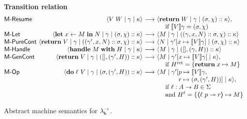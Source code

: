 \documentclass[12pt,phd,lfcs,twoside,openright,logo,leftchapter,normalheadings]{infthesis}
\theoremstyle{plain}
\theoremstyle{definition}
\begin{document}
\begin{figure*}
\raggedright

\textbf{Transition relation}
\[
  \bl
  \ba{@{}l@{~}r@{~}c@{~}l@{~~}l@{}}
\mlab{Resume} & \cek{ V\;W \mid \env \mid \kappa}
               &\stepsto& \cek{ \Return \; W \mid \env \mid (\sigma, \chi) \cons \kappa},\\
               &&&\quad\text{ if }\val{V}{\env} = (\sigma, \chi) \\

\mlab{Let} & \cek{ \Let \; x \revto M \; \In \; N \mid \env \mid (\sigma, \chi) \cons \kappa}
    &\stepsto& \cek{ M \mid \env \mid ((\env,x,N) \cons \sigma, \chi) \cons \kappa} \\

\mlab{PureCont} &\cek{ \Return \; V \mid \env \mid ((\env',x,N) \cons \sigma, \chi) \cons \kappa}
        &\stepsto& \cek{ N \mid \env'[x \mapsto \val{V}{\env}] \mid (\sigma, \chi) \cons \kappa} \\

\mlab{Handle} & \cek{ \Handle \; M \; \With \; H \mid \env \mid \kappa}
       &\stepsto& \cek{ M \mid \env \mid (\nil, (\env, H)) \cons \kappa} \\

\mlab{GenCont} & \cek{ \Return \; V \mid \env \mid (\nil, (\env',H)) \cons \kappa}
                  &\stepsto& \cek{ M \mid \env'[x \mapsto \val{V}{\env}] \mid \kappa},\\
                  &&&\quad\text{ if } \hret = \{\Return\; x \mapsto M\} \\

\mlab{Op} & \cek{ \Do \; \ell~V \mid \env \mid (\sigma, (\env', H)) \cons \kappa }
                 &\stepsto& \cek{ M \mid \env'[\bl
                                               p \mapsto \val{V}\env, \\
                                               r \mapsto (\sigma, (\env', H))] \mid \kappa }, \\
                                               \el \\
                 &&&\quad\bl
                   \text{ if } \ell : A \to B \in \Sigma\\
                   \text{ and } \hell = \{\OpCase{\ell}{p}{r} \mapsto M\}
                   \el\\
\ea
\el
\]
\caption{Abstract machine semantics for $\lambda^\rightarrow_{\mathsf{h}}$.}
\label{fig:abstract-machine-semantics-handlers}
\end{figure*}
\end{document}
